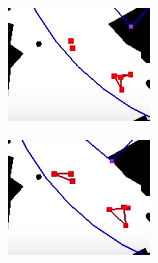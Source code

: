 \documentclass[]{article}
\begin{document}
\begin{figure}[h]
\begin{subfigure}{0.19\textwidth}
    \includegraphics[width=\linewidth]{pics/cluster1.png}
    \caption{}
\end{subfigure}
\begin{subfigure}{0.19\textwidth}
    \includegraphics[width=\linewidth]{pics/cluster2.png}
    \caption{}
\end{subfigure}
\begin{subfigure}{0.19\textwidth}

\end{subfigure}
\end{figure}
\end{document}
